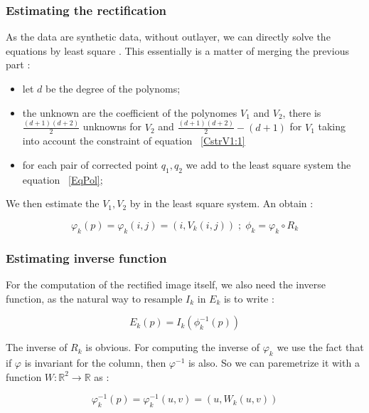 \documentclass{ipol}
\newcommand{\RR}{\ensuremath{\mathbb{R}}}
\begin{document}
\subsubsection{Estimating the rectification}

As the data are synthetic data, without outlayer, we can directly solve
the equations by least square . This essentially is
a matter of merging the previous part :

\begin{itemize}
    \item let $d$ be the degree of the polynoms;
    \item the unknown are the coefficient of the polynomes $V_1$ and $V_2$, there is
          $\frac{(d+1)(d+2)}{2}$ unknowns for $V_2$ and $\frac{(d+1)(d+2)}{2}-(d+1) $  for $V_1$
          taking into account the  constraint of equation ~\ref{CstrV1:1}
     \item for each pair of corrected point $q_1,q_2$ we add to the least square system
          the equation ~\ref{EqPol};
\end{itemize}

We then estimate the $V_1,V_2$ by in the least square system. An obtain :

\begin{equation}
  \varphi_k(p) = \varphi_k(i,j) = (i,V_k(i,j))  \;;\;    \phi_k =  \varphi_k  \circ R_k 
\end{equation}

\subsubsection{Estimating inverse function}

For the computation of the rectified image itself, we also need the inverse function, 
as the natural way to resample  $I_k$ in $E_k$ is to write :

\begin{equation}
  E_k(p) = I_k(\phi^{-1}_k(p))
\end{equation}

The inverse of $R_k$ is obvious. For computing the inverse of $\varphi_k$  we
use the fact that if $\varphi$ is invariant for the column, then $\varphi^{-1}$ is also.
So we can paremetrize it with a function $W : \RR^2 \rightarrow \RR$ as :

\begin{equation}
  \varphi^{-1}_k(p) = \varphi^{-1}_k(u,v) = (u,W_k(u,v))  
\end{equation}
\end{document}
